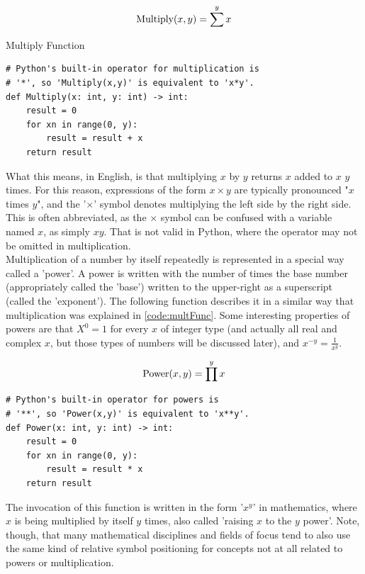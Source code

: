 \begin{equation}\label{func:multiply}
\textnormal{Multiply}(x, y) = \sum^yx
\end{equation}

\begin{listing}[H]
\caption{Multiply Function}\label{code:multiply}
\begin{verbatim}
# Python's built-in operator for multiplication is
# '*', so 'Multiply(x,y)' is equivalent to 'x*y'.
def Multiply(x: int, y: int) -> int:
	result = 0
	for xn in range(0, y):
		result = result + x
	return result
\end{verbatim}
\end{listing}

What this means, in English, is that multiplying $x$ by $y$ returns $x$ added to $x$ $y$ times. For this reason, expressions of the form $x\times y$ are typically pronounced "$x$ times $y$", and the '$\times$' symbol denotes multiplying the left side by the right side. This is often abbreviated, as the $\times$ symbol can be confused with a variable named $x$, as simply $xy$. That is not valid in Python, where the \code{*} operator may not be omitted in multiplication.\\

Multiplication of a number by itself repeatedly is represented in a special way called a 'power'. A power is written with the number of times the base number (appropriately called the 'base') written to the upper-right as a superscript (called the 'exponent'). The following function describes it in a similar way that multiplication was explained in \ref{code:multFunc}. Some interesting properties of powers are that $X^0=1$ for every $x$ of integer type (and actually all real and complex $x$, but those types of numbers will be discussed later), and $x^{-y}=\frac{1}{x^y}$.

\begin{equation}\label{func:power}
\textnormal{Power}(x, y) = \prod^yx
\end{equation}

\begin{listing}[H]
\begin{verbatim}
# Python's built-in operator for powers is
# '**', so 'Power(x,y)' is equivalent to 'x**y'.
def Power(x: int, y: int) -> int:
	result = 0
	for xn in range(0, y):
		result = result * x
	return result
\end{verbatim}
\end{listing}
The invocation of this function is written in the form '$x^y$' in mathematics, where $x$ is being multiplied by itself $y$ times, also called 'raising $x$ to the $y$ power'. Note, though, that many mathematical disciplines and fields of focus tend to also use the same kind of relative symbol positioning for concepts not at all related to powers or multiplication.

